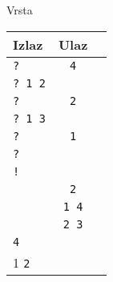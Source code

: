 \begin{statement}[
  problempoints=100,
  timelimit=1 sekunda,
  memorylimit=512 MiB,
]{Vrsta}
{\renewcommand{\arraystretch}{1.4}
  \setlength{\tabcolsep}{6pt}
  \begin{tabular}{lcl}
    Izlaz & Ulaz\\ \midrule
    \texttt{\frenchspacing?} & \texttt{4} \\
    \texttt{\frenchspacing? 1 2} & \texttt{}  \\
    \texttt{\frenchspacing? } & \texttt{2} \\
    \texttt{\frenchspacing? 1 3} & \texttt{} \\
    \texttt{\frenchspacing? } & \texttt{1} \\
    \texttt{\frenchspacing?} & \texttt{}\\
    \texttt{\frenchspacing!} &\\
    \texttt{} & \texttt{2} \\
    \texttt{} & \texttt{1 4} \\
    \texttt{} & \texttt{2 3} \\
    \texttt{4} & \texttt{} \\1
    \texttt{2} & \texttt{} \\
\end{tabular}}


\end{statement}

